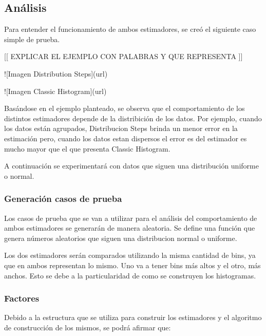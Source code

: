 \documentclass[10pt, a4paper,english,spanish,hidelinks]{article}
\begin{document}
\subsection{Análisis}

Para entender el funcionamiento de ambos estimadores, se creó el siguiente caso simple de prueba.

[[ EXPLICAR EL EJEMPLO CON PALABRAS Y QUE REPRESENTA ]]

![Imagen Distribution Steps](url)

![Imagen Classic Histogram](url)

Basándose en el ejemplo planteado, se observa que el comportamiento de los distintos estimadores depende de la distribición de los datos. Por ejemplo, cuando los datos están agrupados, Distribucion Steps brinda un menor error en la estimación pero,
cuando los datos estan dispersos el error es del estimador es mucho mayor que el que presenta Classic Histogram.

A continuación se experimentará con datos que siguen una distribución uniforme o normal.

\subsubsection{Generación casos de prueba}
Los casos de prueba que se van a utilizar para el análisis del comportamiento de ambos estimadores se generarán de manera aleatoria. Se define una función que genera números aleatorios que siguen una distribucion normal o uniforme. 

Los dos estimadores serán comparados utilizando la misma cantidad de bins, ya que en ambos representan lo mismo. Uno va a tener bins más altos y el otro, más anchos. Esto se debe a la particularidad de como se construyen los histogramas.

\subsubsection{Factores}

Debido a la estructura que se utiliza para construir los estimadores y el algoritmo de construcción de los mismos, se podrá afirmar que:
\end{document}
